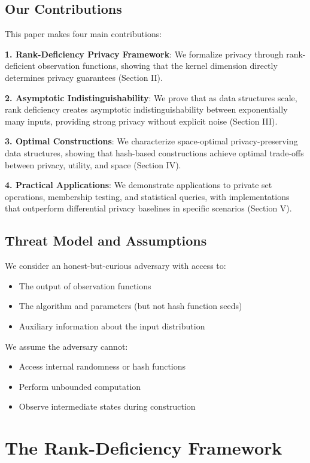 \documentclass[11pt]{article}
\begin{document}
\subsection{Our Contributions}

This paper makes four main contributions:

\textbf{1. Rank-Deficiency Privacy Framework}: We formalize privacy through rank-deficient observation functions, showing that the kernel dimension directly determines privacy guarantees (Section II).

\textbf{2. Asymptotic Indistinguishability}: We prove that as data structures scale, rank deficiency creates asymptotic indistinguishability between exponentially many inputs, providing strong privacy without explicit noise (Section III).

\textbf{3. Optimal Constructions}: We characterize space-optimal privacy-preserving data structures, showing that hash-based constructions achieve optimal trade-offs between privacy, utility, and space (Section IV).

\textbf{4. Practical Applications}: We demonstrate applications to private set operations, membership testing, and statistical queries, with implementations that outperform differential privacy baselines in specific scenarios (Section V).

\subsection{Threat Model and Assumptions}

We consider an honest-but-curious adversary with access to:
\begin{itemize}
\item The output of observation functions
\item The algorithm and parameters (but not hash function seeds)
\item Auxiliary information about the input distribution
\end{itemize}

We assume the adversary cannot:
\begin{itemize}
\item Access internal randomness or hash functions
\item Perform unbounded computation
\item Observe intermediate states during construction
\end{itemize}

\section{The Rank-Deficiency Framework}
\end{document}
